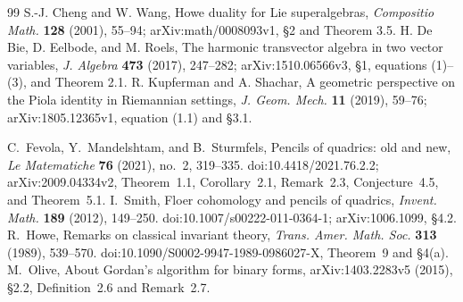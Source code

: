 \begin{thebibliography}{99}
S.-J. Cheng and W. Wang, Howe duality for Lie superalgebras,
\emph{Compositio Math.} \textbf{128} (2001), 55--94;
arXiv:math/0008093v1, \S2 and Theorem 3.5.
H. De Bie, D. Eelbode, and M. Roels,
The harmonic transvector algebra in two vector variables,
\emph{J. Algebra} \textbf{473} (2017), 247--282;
arXiv:1510.06566v3, \S1, equations (1)--(3), and Theorem 2.1.
R. Kupferman and A. Shachar,
A geometric perspective on the Piola identity in Riemannian settings,
\emph{J. Geom. Mech.} \textbf{11} (2019), 59--76;
arXiv:1805.12365v1, equation (1.1) and \S3.1.

C.~Fevola, Y.~Mandelshtam, and B.~Sturmfels,
Pencils of quadrics: old and new,
\emph{Le Matematiche} \textbf{76} (2021), no.~2, 319--335.
doi:10.4418/2021.76.2.2; arXiv:2009.04334v2,
Theorem~1.1, Corollary~2.1, Remark~2.3, Conjecture~4.5, and Theorem~5.1.
I.~Smith, Floer cohomology and pencils of quadrics,
\emph{Invent. Math.} \textbf{189} (2012), 149--250.
doi:10.1007/s00222-011-0364-1; arXiv:1006.1099, \S4.2.
R.~Howe, Remarks on classical invariant theory,
\emph{Trans. Amer. Math. Soc.} \textbf{313} (1989), 539--570.
doi:10.1090/S0002-9947-1989-0986027-X,
Theorem~9 and \S4(a).
M.~Olive, About Gordan's algorithm for binary forms,
arXiv:1403.2283v5 (2015), \S2.2,
Definition~2.6 and Remark~2.7.
\end{thebibliography}
